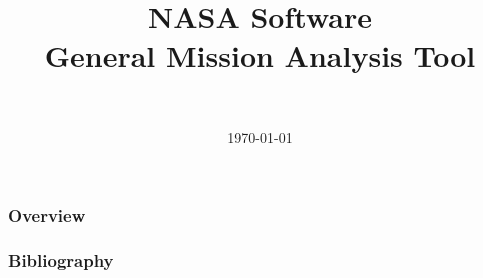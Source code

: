 \documentclass[]{beamer}
\title
[NASA Software\\General Mission Analysis Tool]
{NASA Software\\General Mission Analysis Tool}
\author[Daniel Topa]{\Topa \\ \TopaEmail}
\institute{\unmmath}
\date{\today}
\begin{document}


\begin{frame}
	\titlepage
\end{frame}
	


\begin{frame}\frametitle{Overview}
	\tableofcontents[hideallsubsections]
\end{frame}

	
	
%	
	

{\tiny{
\begin{frame}[allowframebreaks]\frametitle{Bibliography}
	\printbibliography
\end{frame}}}

\begin{frame}
	\titlepage
\end{frame}
\end{document}
